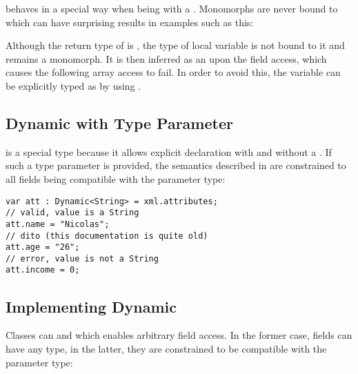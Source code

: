 { behaves in a special way when being  with a . Monomorphs are never bound to  which can have surprising results in examples such as this:


Although the return type of  is , the type of local variable  is not bound to it and remains a monomorph. It is then inferred as an  upon the  field access, which causes the following  array access to fail. In order to avoid this, the variable  can be explicitly typed as  by using .


\subsection{Dynamic with Type Parameter}
\label{types-dynamic-with-type-parameter}

 is a special type because it allows explicit declaration with and without a . If such a type parameter is provided, the semantics described in  are constrained to all fields being compatible with the parameter type:

\begin{lstlisting}
var att : Dynamic<String> = xml.attributes;
// valid, value is a String
att.name = "Nicolas";
// dito (this documentation is quite old)
att.age = "26";
// error, value is not a String
att.income = 0;
\end{lstlisting}


\subsection{Implementing Dynamic}
\label{types-dynamic-implemented}

Classes can   and  which enables arbitrary field access. In the former case, fields can have any type, in the latter, they are constrained to be compatible with the parameter type:

}
